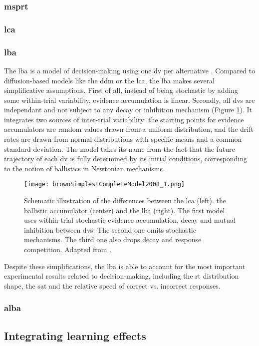 \subsubsection{\acrlong{msprt}}

\subsubsection{\acrlong{lca}}

\subsubsection{\acrlong{lba}}

The \acrfull{lba} is a model of decision-making using one \acrlong{dv} per alternative \cite{brownSimplestCompleteModel2008}. Compared to diffusion-based models like the \acrshort{ddm} or the \acrshort{lca}, the \acrshort{lba} makes several simplificative assumptions. First of all, instead of being stochastic by adding some within-trial variability, evidence accumulation is linear. Secondly, all \acrshort{dv}s are independant and not subject to any decay or inhibition mechanism (Figure \ref{figure:lba}). It integrates two sources of inter-trial variability: the starting points for evidence accumulators are random values drawn from a uniform distribution, and the drift rates are drawn from normal distributions with specific means and a common standard deviation. The model takes its name from the fact that the future trajectory of each \acrshort{dv} is fully determined by its initial conditions, corresponding to the notion of ballistics in Newtonian mechanisms.

\begin{figure}[ht]
    \centering
    \texttt{[image: brownSimplestCompleteModel2008\_1.png]}
    \caption[The \acrlong{lba}]{Schematic illustration of the differences between the \acrshort{lca} (left). the ballistic accumulator (center) and the \acrshort{lba} (right). The first model uses within-trial stochastic evidence accumulation, decay and mutual inhibition between \Acrlong{dv}s. The second one omits stochastic mechanisms. The third one also drops decay and response competition. Adapted from \cite{brownSimplestCompleteModel2008}.}
    \label{figure:lba}
\end{figure}

Despite these simplifications, the \acrshort{lba} is able to account for the most important experimental results related to decision-making, including the \acrshort{rt} distribution shape, the \acrlong{sat} and the relative speed of correct vs. incorrect responses. 

\subsubsection{\acrlong{alba}}


\subsection{Integrating learning effects}